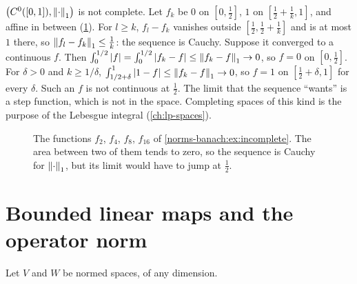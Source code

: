 \begin{notechapter}
\begin{example}\label{norms-banach:ex:incomplete}
$\bigl(C^0([0, 1]), \left\|\cdot\right\|_1\bigr)$ is not complete. Let $f_k$ be $0$
on $[0, \frac12]$, $1$ on $[\frac12 + \frac1k, 1]$, and affine in between
(\cref{norms-banach:fig:ramps}). For $l\geq k$, $f_l - f_k$ vanishes
outside $[\frac12, \frac12 + \frac1k]$ and is at most $1$ there, so
$\left\|f_l - f_k\right\|_1\leq\frac1k$: the sequence is Cauchy. Suppose it
converged to a continuous $f$. Then
$\int_0^{1/2}\left|f\right| = \int_0^{1/2}\left|f_k - f\right|\leq\left\|f_k - f\right\|_1\to0$,
so $f = 0$ on $[0, \frac12]$. For $\delta > 0$ and $k\geq1/\delta$,
$\int_{1/2 + \delta}^1\left|1 - f\right|\leq\left\|f_k - f\right\|_1\to0$, so $f = 1$ on
$[\frac12 + \delta, 1]$ for every $\delta$. Such an $f$ is not continuous
at $\frac12$. The limit that the sequence ``wants'' is a step function,
which is not in the space. Completing spaces of this kind is the purpose
of the Lebesgue integral (\cref{ch:lp-spaces}).
\end{example}

\begin{figure}[ht]
\centering
{}
\caption{The functions $f_2$, $f_4$, $f_8$, $f_{16}$ of
\cref{norms-banach:ex:incomplete}. The area between two of them tends to
zero, so the sequence is Cauchy for $\left\|\cdot\right\|_1$, but its limit would
have to jump at $\frac12$.}
\label{norms-banach:fig:ramps}
\end{figure}

\section{Bounded linear maps and the operator norm}
\label{norms-banach:sec:operators}

Let $V$ and $W$ be normed spaces, of any dimension.


\end{notechapter}
